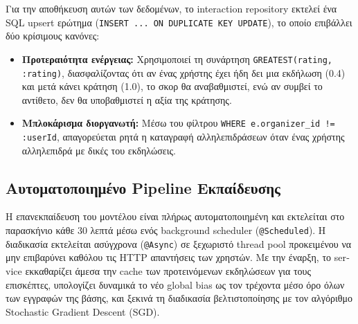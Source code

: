 \documentclass[12pt]{fphw}
\newcommand{\en}[1]{\foreignlanguage{english}{#1}}
\begin{document}
Για την αποθήκευση αυτών των δεδομένων, το \en{interaction repository} εκτελεί ένα \en{SQL upsert} ερώτημα (\en{\texttt{INSERT ... ON DUPLICATE KEY UPDATE}}), το οποίο επιβάλλει δύο κρίσιμους κανόνες:
\begin{itemize}[leftmargin=*]
    \item \textbf{Προτεραιότητα ενέργειας:} Χρησιμοποιεί τη συνάρτηση \en{\texttt{GREATEST(rating, :rating)}}, διασφαλίζοντας ότι αν ένας χρήστης έχει ήδη δει μια εκδήλωση (0.4) και μετά κάνει κράτηση (1.0), το σκορ θα αναβαθμιστεί, ενώ αν συμβεί το αντίθετο, δεν θα υποβαθμιστεί η αξία της κράτησης.
    \item \textbf{Μπλοκάρισμα διοργανωτή:} Μέσω του φίλτρου \en{\texttt{WHERE e.organizer\_id != :userId}}, απαγορεύεται ρητά η καταγραφή αλληλεπιδράσεων όταν ένας χρήστης αλληλεπιδρά με δικές του εκδηλώσεις.
\end{itemize}

\subsection{Αυτοματοποιημένο Pipeline Εκπαίδευσης}
Η επανεκπαίδευση του μοντέλου είναι πλήρως αυτοματοποιημένη και εκτελείται στο παρασκήνιο κάθε 30 λεπτά μέσω ενός background scheduler (\en{\texttt{@Scheduled}}). Η διαδικασία εκτελείται ασύγχρονα (\en{\texttt{@Async}}) σε ξεχωριστό \en{thread pool} προκειμένου να μην επιβαρύνει καθόλου τις \en{HTTP} απαντήσεις των χρηστών. Με την έναρξη, το \en{service} εκκαθαρίζει άμεσα την \en{cache} των προτεινόμενων εκδηλώσεων για τους επισκέπτες, υπολογίζει δυναμικά το νέο \en{global bias} ως τον τρέχοντα μέσο όρο όλων των εγγραφών της βάσης, και ξεκινά τη διαδικασία βελτιστοποίησης με τον αλγόριθμο \en{Stochastic Gradient Descent (SGD)}.
\end{document}
